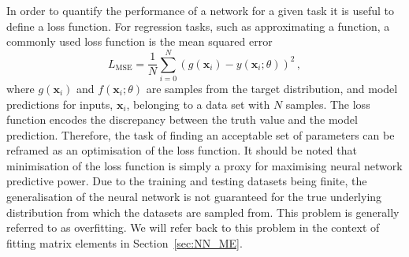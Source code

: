 \documentclass[main.tex]{subfiles}
\begin{document}
    In order to quantify the performance of a network for
    a given task it is useful to define a loss function.
    For regression tasks, such as approximating a function,
    a commonly used loss function is the mean squared error
    \begin{equation}\label{eqn:MSE}
        L_{\mathrm{MSE}} = \dfrac{1}{N} \sum_{i=0}^{N} (g(\mathbf{x}_{i}) - y(\mathbf{x}_{i}; \theta))^{2} \, ,
    \end{equation}
    where $g(\mathbf{x}_{i})$ and $f(\mathbf{x}_{i}; \theta)$
    are samples from the target distribution, and model predictions
    for inputs, $\mathbf{x}_{i}$, belonging to a data set with $N$
    samples. The loss function
    encodes the discrepancy between the truth value
    and the model prediction. Therefore, the task of finding
    an acceptable set of parameters can be reframed as an optimisation
    of the loss function. It should be noted that minimisation of
    the loss function is simply a proxy for maximising neural network
    predictive power. Due to the training and testing datasets being finite,
    the generalisation of the neural network is not guaranteed for the
    true underlying distribution from which the datasets are sampled
    from. This problem is generally referred to as overfitting.
    We will refer back to this problem in the context of
    fitting matrix elements in Section~\ref{sec:NN_ME}.
\end{document}
